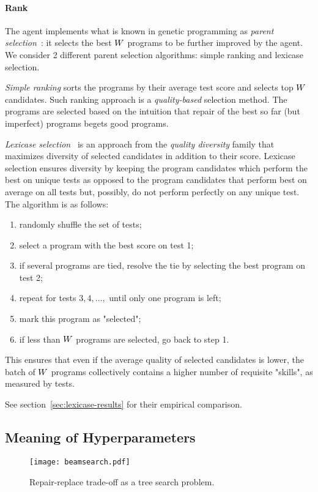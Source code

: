 \paragraph{Rank}

The \rank{} agent implements what is known in genetic programming as \emph{parent selection}~\cite{koza1994:genetic}: it selects the best $W{}$ programs to be further improved by the \debug{} agent.
We consider 2 different parent selection algorithms: simple ranking and lexicase selection.

\emph{Simple ranking} sorts the programs by their average test score and selects top $W{}$ candidates. 
Such ranking approach is a \emph{quality-based} selection method.
The programs are selected based on the intuition that repair of the best so far (but imperfect) programs begets good programs.

\emph{Lexicase selection}~\cite{helmuth2015:solving} is an approach from the \emph{quality diversity} family that maximizes diversity of selected candidates in addition to their score.
Lexicase selection ensures diversity by keeping the program candidates which perform the best on unique tests as opposed to the program candidates that perform best on average on all tests but, possibly, do not perform perfectly on any unique test.
The algorithm is as follows:
\begin{enumerate}
    \item randomly shuffle the set of tests;
    \item select a program with the best score on test 1;
    \item if several programs are tied, resolve the tie by selecting the best program on test 2;
    \item repeat for tests $3,4,\dots,$ until only one program is left;
    \item mark this program as "selected";
    \item if less than $W$ programs are selected, go back to step 1.
\end{enumerate}
This ensures that even if the average quality of selected candidates is lower, the batch of $W{}$ programs collectively contains a higher number of requisite "skills", as measured by tests.

See section~\ref{sec:lexicase-results} for their empirical comparison.

\newpage \subsection{Meaning of Hyperparameters}
\label{sec:beam-search}
\begin{figure}
    \centering
    \texttt{[image: beamsearch.pdf]}
    \caption{Repair-replace trade-off as a tree search problem.}
    \label{fig:beam-search}
\end{figure}

